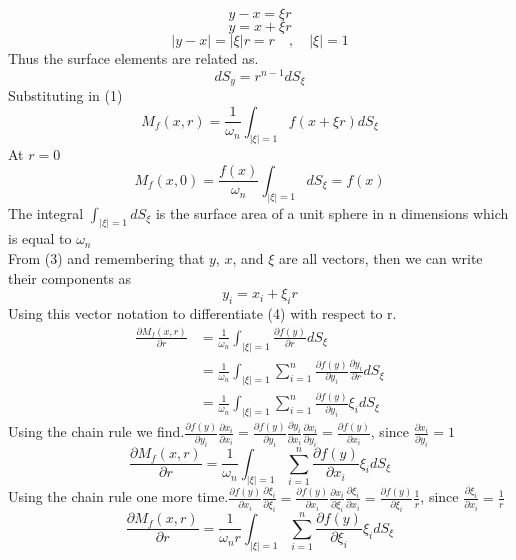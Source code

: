 \[
    y-x = \xi r    
\]
\begin{equation}
y = x + \xi r
\end{equation}
\[
    |y-x| = |\xi|r = r \quad,\quad |\xi| = 1    
\]
Thus the surface elements are related as.
\[
    dS_y = r^{n-1} dS_\xi    
\]
Substituting in (1)
\begin{equation}
M_{f}(x,r) = \frac{1}{\omega_{n}} \int_{|\xi|=1} f(x+\xi r)dS_\xi
\end{equation} 
At $r = 0$
\begin{equation}
M_{f}(x,0) = \frac{f(x)}{\omega_{n}} \int_{|\xi|=1} dS_\xi = f(x)
\end{equation}
The integral $\displaystyle \int_{|\xi|=1} dS_\xi$ is the surface area of a unit sphere in n dimensions which is equal to $\omega_n$
\\
From (3) and remembering that $y$, $x$, and $\xi$ are all vectors, then we can write their components as
\[
    y_i = x_i + \xi_i r    
\]
Using this vector notation to differentiate (4) with respect to r.
\begin{align*}
\frac{\partial M_f (x,r)}{\partial r} &= \frac{1}{\omega_n} \int_{|\xi|=1} \frac{\partial f(y)}{\partial r}dS_\xi
\\
&= \frac{1}{\omega_n} \int_{|\xi|=1} \sum_{i=1}^{n} \frac{\partial f(y)}{\partial y_i}\frac{\partial y_i}{\partial r} dS_\xi
\\
&= \frac{1}{\omega_n} \int_{|\xi|=1} \sum_{i=1}^{n} \frac{\partial f(y)}{\partial y_i}\xi_i dS_\xi
\end{align*}
Using the chain rule we find.$\displaystyle \frac{\partial f(y)}{\partial y_i} \frac{\partial x_i}{\partial x_i} = \frac{\partial f(y)}{\partial y_i} \frac{\partial y_i}{\partial x_i}\frac{\partial x_i}{\partial y_i} = \frac{\partial f(y)}{\partial x_i}$, since $\displaystyle \frac{\partial x_i}{\partial y_i} = 1$
\[
    \frac{\partial M_f (x,r)}{\partial r} = \frac{1}{\omega_n} \int_{|\xi|=1} \sum_{i=1}^{n} \frac{\partial f(y)}{\partial x_i}\xi_i dS_\xi    
\]
Using the chain rule one more time.$\displaystyle \frac{\partial f(y)}{\partial x_i} \frac{\partial \xi_i}{\partial \xi_i}= \frac{\partial f(y)}{\partial x_i}\frac{\partial x_i}{\partial \xi_i}\frac{\partial \xi_i}{\partial x_i} = \frac{\partial f(y)}{\partial \xi_i}\frac{1}{r}$, since $\displaystyle \frac{\partial \xi_i}{\partial x_i} = \frac{1}{r}$
\begin{equation}
\frac{\partial M_f (x,r)}{\partial r} = \frac{1}{\omega_n r} \int_{|\xi|=1} \sum_{i=1}^{n} \frac{\partial f(y)}{\partial \xi_i}\xi_i dS_\xi
\end{equation}
